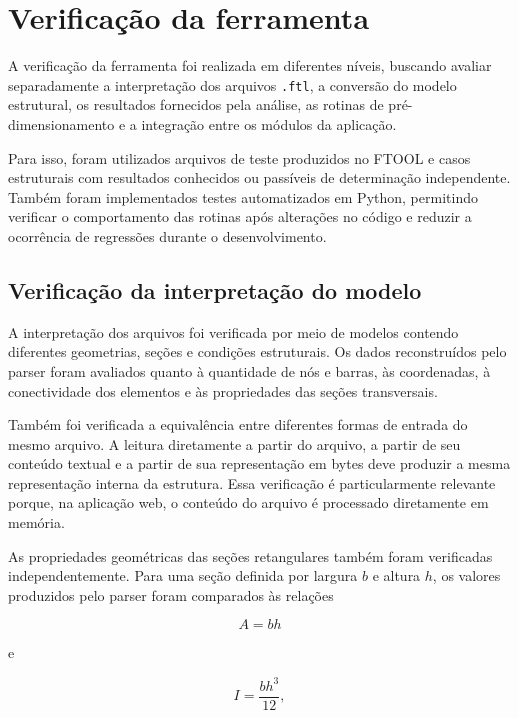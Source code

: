 \section{Verificação da ferramenta}
\label{sec:metodologia-verificacao}

A verificação da ferramenta foi realizada em diferentes níveis, buscando avaliar separadamente a interpretação dos arquivos \texttt{.ftl}, a conversão do modelo estrutural, os resultados fornecidos pela análise, as rotinas de pré-dimensionamento e a integração entre os módulos da aplicação.

Para isso, foram utilizados arquivos de teste produzidos no \acrshort{FTOOL} e casos estruturais com resultados conhecidos ou passíveis de determinação independente. Também foram implementados testes automatizados em Python, permitindo verificar o comportamento das rotinas após alterações no código e reduzir a ocorrência de regressões durante o desenvolvimento.

\subsection{Verificação da interpretação do modelo}
\label{subsec:verificacao-parser}

A interpretação dos arquivos foi verificada por meio de modelos contendo diferentes geometrias, seções e condições estruturais. Os dados reconstruídos pelo parser foram avaliados quanto à quantidade de nós e barras, às coordenadas, à conectividade dos elementos e às propriedades das seções transversais.

Também foi verificada a equivalência entre diferentes formas de entrada do mesmo arquivo. A leitura diretamente a partir do arquivo, a partir de seu conteúdo textual e a partir de sua representação em bytes deve produzir a mesma representação interna da estrutura. Essa verificação é particularmente relevante porque, na aplicação web, o conteúdo do arquivo é processado diretamente em memória.

As propriedades geométricas das seções retangulares também foram verificadas independentemente. Para uma seção definida por largura \(b\) e altura \(h\), os valores produzidos pelo parser foram comparados às relações

\begin{equation}
    A = bh
\end{equation}

e

\begin{equation}
    I = \frac{bh^3}{12},
\end{equation}

